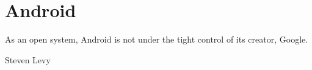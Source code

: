 \section{Android}

\epigraph{As an open system, Android is not under the tight control of its creator, Google.}{Steven Levy}





